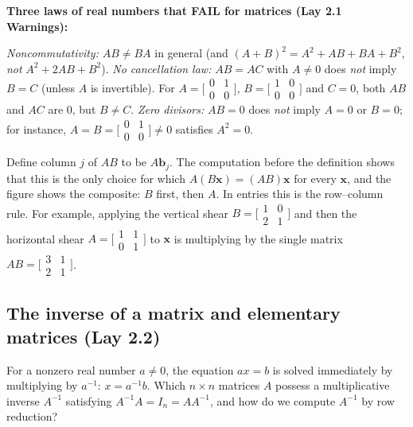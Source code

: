 \documentclass[10pt]{scrartcl}
\newcommand{\vv}[1]{\mathbf{#1}}
\begin{document}
\begin{trapbox}
  \ii \textbf{Three laws of real numbers that FAIL for matrices (Lay 2.1 Warnings):}
  \begin{enumerate}[(1)]
    \ii \emph{Noncommutativity:} $AB\ne BA$ in general (and $(A+B)^2=A^2+AB+BA+B^2$, \emph{not} $A^2+2AB+B^2$).
    \ii \emph{No cancellation law:} $AB=AC$ with $A\ne 0$ does \emph{not} imply $B=C$ (unless $A$ is invertible). For $A=\bigl[\begin{smallmatrix}0&1\\0&0\end{smallmatrix}\bigr]$, $B=\bigl[\begin{smallmatrix}1&0\\0&0\end{smallmatrix}\bigr]$ and $C=0$, both $AB$ and $AC$ are $0$, but $B\ne C$.
    \ii \emph{Zero divisors:} $AB=0$ does \emph{not} imply $A=0$ or $B=0$; for instance, $A=B=\bigl[\begin{smallmatrix}0&1\\0&0\end{smallmatrix}\bigr]\ne 0$ satisfies $A^2=0$.
  \end{enumerate}
\end{trapbox}

\revisit
Define column $j$ of $AB$ to be $A\vv b_j$. The computation before the definition shows that this is the only choice for which $A(B\vv x)=(AB)\vv x$ for every $\vv x$, and the figure shows the composite: $B$ first, then $A$. In entries this is the row--column rule. For example, applying the vertical shear $B=\bigl[\begin{smallmatrix}1&0\\2&1\end{smallmatrix}\bigr]$ and then the horizontal shear $A=\bigl[\begin{smallmatrix}1&1\\0&1\end{smallmatrix}\bigr]$ to $\vv x$ is multiplying by the single matrix $AB=\bigl[\begin{smallmatrix}3&1\\2&1\end{smallmatrix}\bigr]$.

\subsection{The inverse of a matrix and elementary matrices (Lay 2.2)}

\begin{qbox}
  For a nonzero real number $a\ne 0$, the equation $ax=b$ is solved immediately by multiplying by $a^{-1}$: $x=a^{-1}b$. Which $n\times n$ matrices $A$ possess a multiplicative inverse $A^{-1}$ satisfying $A^{-1}A=I_n=AA^{-1}$, and how do we compute $A^{-1}$ by row reduction?
\end{qbox}
\end{document}

